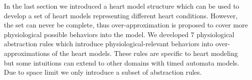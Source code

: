 \label{ruleBasedHeartModelAbstraction}
In the last section we introduced a heart model structure which can be used to develop a set of heart models representing different heart conditions. However, the set can never be complete, thus over-approximation is proposed to cover more physiological possible behaviors into the model. We developed 7 physiological abstraction rules which introduce physiological-relevant behaviors into over-approximations of the heart models. These rules are specific to heart modeling but some intuitions can extend to other domains with timed automata models. Due to space limit we only introduce a subset of abstraction rules. %

